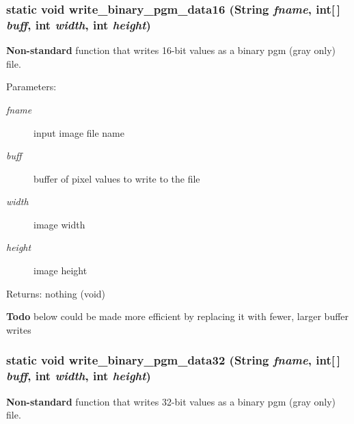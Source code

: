 \subsubsection{\setlength{\rightskip}{0pt plus 5cm}static void write\_\-binary\_\-pgm\_\-data16 (String {\em fname}, int[$\,$] {\em buff}, int {\em width}, int {\em height})\hspace{0.3cm}{\tt  [static]}}\label{class_c_s_image_viewer_1_1pnm_helper_b9389279b59ecaff8492133a68a59b98}


{\bf Non-standard} function that writes 16-bit values as a binary pgm (gray only) file. 

\begin{Desc}
\item[Parameters:]
\begin{description}
\item[{\em fname}]input image file name \item[{\em buff}]buffer of pixel values to write to the file \item[{\em width}]image width \item[{\em height}]image height\end{description}
\end{Desc}
\begin{Desc}
\item[Returns:]nothing (void)\end{Desc}
\begin{Desc}
\item[{\bf Todo}]below could be made more efficient by replacing it with fewer, larger buffer writes \end{Desc}
\subsubsection{\setlength{\rightskip}{0pt plus 5cm}static void write\_\-binary\_\-pgm\_\-data32 (String {\em fname}, int[$\,$] {\em buff}, int {\em width}, int {\em height})\hspace{0.3cm}{\tt  [static]}}\label{class_c_s_image_viewer_1_1pnm_helper_37c7b83d8f17d8e3c8a8ecafe511d070}


{\bf Non-standard} function that writes 32-bit values as a binary pgm (gray only) file. 

